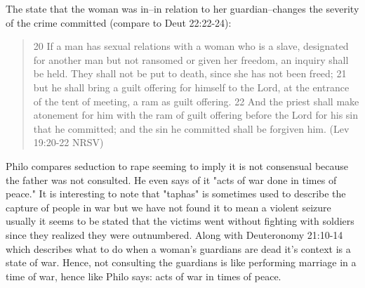 \documentclass[11pt]{article}
\begin{document}
The state that the woman was in--in relation to her guardian--changes the severity of the crime committed (compare to Deut 22:22-24):
\begin{quote}
20 If a man has sexual relations with a woman who is a slave, designated for another man but not ransomed or given her freedom, an inquiry shall be held. They shall not be put to death, since she has not been freed; 21 but he shall bring a guilt offering for himself to the Lord, at the entrance of the tent of meeting, a ram as guilt offering. 22 And the priest shall make atonement for him with the ram of guilt offering before the Lord for his sin that he committed; and the sin he committed shall be forgiven him. (Lev 19:20-22 NRSV)
\end{quote}

Philo compares seduction to rape seeming to imply it is not consensual because the father was not consulted. He even says of it "acts of war done in times of peace." It is interesting to note that "taphas" is sometimes used to describe the capture of people in war but we have not found it to mean a violent seizure usually it seems to be stated that the victims went without fighting with soldiers since they realized they were outnumbered. Along with Deuteronomy 21:10-14 which describes what to do when a woman's guardians are dead it's context is a state of war. Hence, not consulting the guardians is like performing marriage in a time of war, hence like Philo says: acts of war in times of peace.
\end{document}
